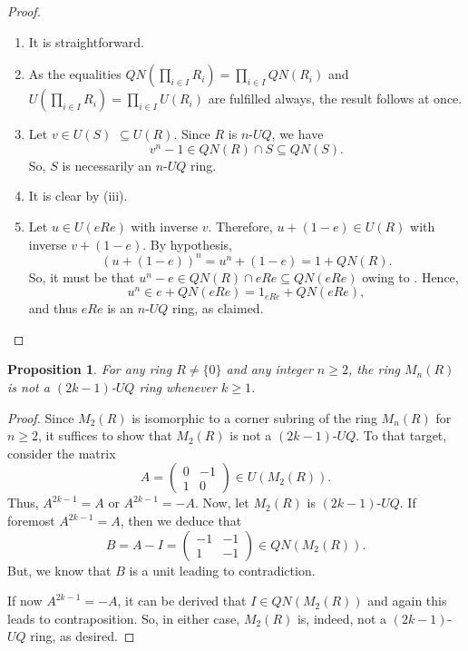 \documentclass[12pt]{amsart}
\newtheorem{proposition}[theorem]{Proposition}
\theoremstyle{definition}
\begin{document}
\begin{proof}
\begin{enumerate}
\item
It is straightforward.
\item
As the equalities \(QN(\prod_{i \in I} R_i) = \prod_{i \in I} QN(R_i)\) and \(U(\prod_{i \in I} R_i) = \prod_{i \in I} U(R_i)\) are fulfilled always, the result follows at once.
\item
Let \(v \in U(S)\) \(\subseteq U(R)\). Since \(R\) is $n$-$UQ$, we have \[ v^n-1 \in QN(R) \cap S \subseteq QN(S).\] So, \(S\) is necessarily an $n$-$UQ$ ring.
\item
It is clear by (iii).
\item
Let $u \in U(eRe)$ with inverse $v$. Therefore, $u + (1 - e) \in U(R)$ with inverse $v + (1 - e)$. By hypothesis, $$(u + (1-e))^n = u^n + (1 - e) = 1 + QN(R).$$ So, it must be that $u^n - e \in QN(R)\cap eRe\subseteq QN(eRe)$ owing to \cite[Lemma 3.5]{chen2012}. Hence, $$u^n \in e + QN(eRe) = 1_{eRe} + QN(eRe),$$ and thus $eRe$ is an $n$-$UQ$ ring, as claimed.
\end{enumerate}
\end{proof}

\begin{proposition}\label{2.10}
For any ring \( R \neq \{0\} \) and any integer \( n \geq 2 \), the ring \( M_n(R) \) is not a $(2k-1)$-$UQ$ ring whenever $k\geq 1$.
\end{proposition}

\begin{proof}
Since \( M_2(R) \) is isomorphic to a corner subring of the ring \( M_n(R) \) for \( n \geq 2 \), it suffices to show that \( M_2(R) \) is not a $(2k-1)$-$UQ$. To that target, consider the matrix
\[
A = \begin{pmatrix} 0 & -1 \\ 1 & 0 \end{pmatrix} \in U(M_2(R)).
\]
Thus, $A^{2k-1}=A$ or $A^{2k-1}=-A$. Now, let $M_2(R)$ is $(2k-1)$-$UQ$. If foremost $A^{2k-1}=A$, then we deduce that
\[
B=A-I=\begin{pmatrix} -1 & -1 \\ 1 & -1 \end{pmatrix}\in QN(M_2(R)).
\]
But, we know that $B$ is a unit leading to contradiction.

If now $A^{2k-1}=-A$, it can be derived that $I\in QN(M_2(R))$ and again this leads to contraposition. So, in either case, \( M_2(R) \) is, indeed, not a $(2k-1)$-$UQ$ ring, as desired.
\end{proof}
\end{document}
